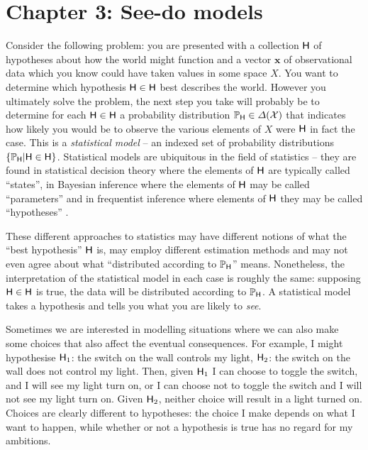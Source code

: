 

\chapter{Chapter 3: See-do models}



Consider the following problem: you are presented with a collection $\mathsf{H}$ of hypotheses about how the world might function and a vector $\mathbf{x}$ of observational data which you know could have taken values in some space $X$. You want to determine which hypothesis $\mathsf{H}\in \mathsf{H}$ best describes the world. However you ultimately solve the problem, the next step you take will probably be to determine for each $\mathsf{H}\in \mathsf{H}$ a probability distribution $\mathbb{P}_{\mathsf{H}}\in \Delta(\mathcal{X})$ that indicates how likely you would be to observe the various elements of $X$ were $\mathsf{H}$ in fact the case. This is a \emph{statistical model} -- an indexed set of probability distributions $\{\mathbb{P}_{\mathsf{H}}|\mathsf{H}\in \mathsf{H}\}$. Statistical models are ubiquitous in the field of statistics -- they are found in statistical decision theory where the elements of $\mathsf{H}$ are typically called ``states''\citep{wald_statistical_1950}, in Bayesian inference where the elements of $\mathsf{H}$ may be called ``parameters'' \citep{freedman_asymptotic_1963} and in frequentist inference where elements of $\mathsf{H}$ they may be called ``hypotheses'' \citep{fisher_statistical_1992}. 

These different approaches to statistics may have different notions of what the ``best hypothesis'' $\mathsf{H}$ is, may employ different estimation methods and may not even agree about what ``distributed according to $\mathbb{P}_{\mathsf{H}}$'' means. Nonetheless, the interpretation of the statistical model in each case is roughly the same: supposing $\mathsf{H}\in\mathsf{H}$ is true, the data will be distributed according to $\mathbb{P}_{\mathsf{H}}$. A statistical model takes a hypothesis and tells you what you are likely to \emph{see}.

Sometimes we are interested in modelling situations where we can also make some choices that also affect the eventual consequences. For example, I might hypothesise $\mathsf{H}_1$: the switch on the wall controls my light, $\mathsf{H}_2$: the switch on the wall does not control my light. Then, given $\mathsf{H}_1$ I can choose to toggle the switch, and I will see my light turn on, or I can choose not to toggle the switch and I will not see my light turn on. Given $\mathsf{H}_2$, neither choice will result in a light turned on. Choices are clearly different to hypotheses: the choice I make depends on what I want to happen, while whether or not a hypothesis is true has no regard for my ambitions.

